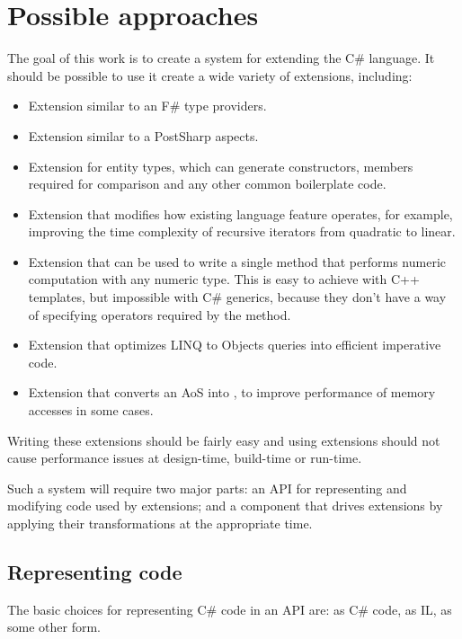 \chapter{Possible approaches}

The goal of this work is to create a system for extending the C\# language. It should be possible to use it create a wide variety of extensions, including:

\begin{itemize}
\item Extension similar to an F\# type providers.
\item Extension similar to a PostSharp aspects.
\item Extension for entity types, which can generate constructors, members required for comparison and any other common boilerplate code.
\item Extension that modifies how existing language feature operates, for example, improving the time complexity of recursive iterators from quadratic to linear.
\item Extension that can be used to write a single method that performs numeric computation with any numeric type. This is easy to achieve with C++ templates, but impossible with C\# generics, because they don't have a way of specifying operators required by the method.
\item Extension that optimizes LINQ to Objects queries into efficient imperative code.
\item Extension that converts an \ac{AoS} into , to improve performance of memory accesses in some cases.
\end{itemize}


Writing these extensions should be fairly easy and using extensions should not cause performance issues at design-time, build-time or run-time.

\medskip

Such a system will require two major parts: an \ac{API} for representing and modifying code used by extensions; and a component that drives extensions by applying their transformations at the appropriate time.

\section{Representing code}

The basic choices for representing C\# code in an \ac{API} are: as C\# code, as \ac{IL}, as some other form.

